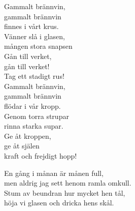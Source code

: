 \documentclass[a6paper, 10pt, twoside]{article}
\begin{document}
\newpage
\noindent
\begin{center}
\end{center}
\begin{lyrics}
Gammalt brännvin, \\
gammalt brännvin \\
finnes i vårt krus. \\
Vänner slå i glasen, \\
mången stora snapsen \\
Gån till verket, \\
gån till verket! \\
Tag ett stadigt rus! 
\vspace{5pt}\\
Gammalt brännvin, \\
gammalt brännvin \\
flödar i vår kropp. \\
Genom torra strupar \\
rinna starka supar. \\
Ge åt kroppen, \\
ge åt själen \\
kraft och frejdigt hopp! 
\end{lyrics}
\vspace{50pt}
\begin{center}
\end{center}
\begin{lyrics}
En gång i månan är månen full, \\
men aldrig jag sett henom ramla omkull. \\
Stum av beundran hur mycket hen tål, \\
höja vi glasen och dricka hens skål. 
\end{lyrics}
\end{document}
